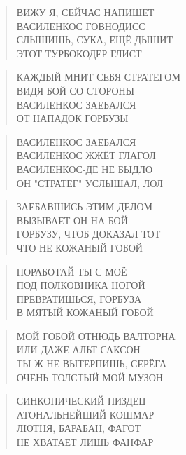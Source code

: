 \poemtitle{***}
\begin{verse}
ВИЖУ Я, СЕЙЧАС НАПИШЕТ\\
ВАСИЛЕНКОС ГОВНОДИСС\\
СЛЫШИШЬ, СУКА, ЕЩЁ ДЫШИТ\\
ЭТОТ ТУРБОКОДЕР-ГЛИСТ
\end{verse}

\poemtitle{***}
\begin{verse}
КАЖДЫЙ МНИТ СЕБЯ СТРАТЕГОМ\\
ВИДЯ БОЙ СО СТОРОНЫ\\
ВАСИЛЕНКОС ЗАЕБАЛСЯ\\
ОТ НАПАДОК ГОРБУЗЫ
\end{verse}

\poemtitle{***}
\begin{verse}
ВАСИЛЕНКОС ЗАЕБАЛСЯ\\
ВАСИЛЕНКОС ЖЖЁТ ГЛАГОЛ\\
ВАСИЛЕНКОС-ДЕ НЕ БЫДЛО\\
ОН "СТРАТЕГ" УСЛЫШАЛ, ЛОЛ
\end{verse}

\poemtitle{***}
\begin{verse}
ЗАЕБАВШИСЬ ЭТИМ ДЕЛОМ\\
ВЫЗЫВАЕТ ОН НА БОЙ\\
ГОРБУЗУ, ЧТОБ ДОКАЗАЛ ТОТ\\
ЧТО НЕ КОЖАНЫЙ ГОБОЙ
\end{verse}

\poemtitle{***}
\begin{verse}
ПОРАБОТАЙ ТЫ С МОЁ\\
ПОД ПОЛКОВНИКА НОГОЙ\\
ПРЕВРАТИШЬСЯ, ГОРБУЗА\\
В МЯТЫЙ КОЖАНЫЙ ГОБОЙ
\end{verse}

\poemtitle{***}
\begin{verse}
МОЙ ГОБОЙ ОТНЮДЬ ВАЛТОРНА\\
ИЛИ ДАЖЕ АЛЬТ-САКСОН\\
ТЫ Ж НЕ ВЫТЕРПИШЬ, СЕРЁГА\\
ОЧЕНЬ ТОЛСТЫЙ МОЙ МУЗОН
\end{verse}

\poemtitle{***}
\begin{verse}
СИНКОПИЧЕСКИЙ ПИЗДЕЦ\\
АТОНАЛЬНЕЙШИЙ КОШМАР\\
ЛЮТНЯ, БАРАБАН, ФАГОТ\\
НЕ ХВАТАЕТ ЛИШЬ ФАНФАР
\end{verse}

